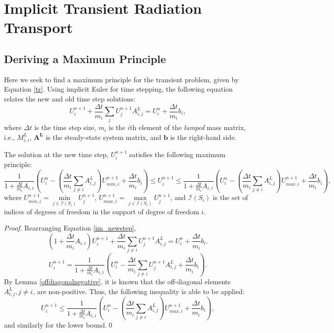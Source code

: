 \section{Implicit Transient Radiation Transport}
\subsection{Deriving a Maximum Principle}
Here we seek to find a maximum principle for the transient problem, given by
Equation \ref{tr}.
Using implicit Euler for time stepping, the following equation relates the new and old
time step solutions:
\begin{equation}\label{im_newstep}
   U_i^{n+1} + \frac{\Delta t}{m_i}\sum\limits_j U_j^{n+1} A^L_{i,j} =
   U_i^n  + \frac{\Delta t}{m_i}b_i,
\end{equation}
where $\Delta t$ is the time step size, $m_i$ is the $i$th element of the \emph{lumped} mass
matrix, i.e., $M^L_{i,i}$, $\mathbf{A^L}$ is the steady-state system matrix, and
$\mathbf{b}$ is the right-hand side.

\begin{theorem}
The solution at the new time step, $U^{n+1}_i$ satisfies the following maximum principle:
\begin{equation}\label{implicit_max_principle}
   \frac{1}{1+\frac{\Delta t}{m_i}A_{i,i}}\left(U_i^n - \left(\frac{\Delta t}{m_i}
   \sum\limits_{j\ne i} A^L_{i,j}\right)U_{min,i}^{n+1} + \frac{\Delta t}{m_i}b_i\right)
   \le U_i^{n+1} \le
   \frac{1}{1+\frac{\Delta t}{m_i}A_{i,i}}\left(U_i^n - \left(\frac{\Delta t}{m_i}
   \sum\limits_{j\ne i} A^L_{i,j}\right)U_{max,i}^{n+1} + \frac{\Delta t}{m_i}b_i\right),
\end{equation}
where $U_{min,i}^{n+1} = \min\limits_{j\in \mathcal{I}(S_i)}U_j^{n+1}$, $U_{max,i}^{n+1} = \max\limits_{j\in \mathcal{I}(S_i)}U_j^{n+1}$,
and $\mathcal{I}(S_i)$ is the set of indices of degrees of freedom in the support of degree of freedom $i$.
\end{theorem}
\begin{proof}
Rearranging Equation \ref{im_newstep},
\[
   \left(1+\frac{\Delta t}{m_i}A_{i,i}\right)U_i^{n+1} + \frac{\Delta t}{m_i}
      \sum\limits_{j\ne i} U_j^{n+1} A^L_{i,j} = U_i^n  + \frac{\Delta t}{m_i}b_i.
\]
\[
   U_i^{n+1} = \frac{1}{1+\frac{\Delta t}{m_i}A_{i,i}}\left(U_i^n - \frac{\Delta t}{m_i}\sum\limits_{j\ne i} U_j^{n+1} A^L_{i,j} + \frac{\Delta t}{m_i}b_i\right).
\]
By Lemma \ref{offdiagonalnegative}, it is known that the off-diagonal
elements $A^L_{i,j}, j\ne i$, are non-positive. Thus, the following inequality is able to be applied:
\[
   U_i^{n+1} \le
      \frac{1}{1+\frac{\Delta t}{m_i}A_{i,i}}\left(U_i^n - \left(\frac{\Delta t}{m_i}\sum\limits_{j\ne i} A^L_{i,j}\right)U_{max,i}^{n+1} + \frac{\Delta t}{m_i}b_i\right),
\]
and similarly for the lower bound.\qed
\end{proof}